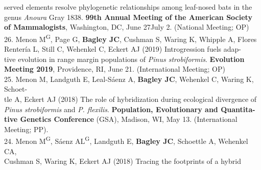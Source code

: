 \documentclass[margin,line]{res}
\begin{document}
\begin{resume}
\hspace*{8mm} served elements resolve phylogenetic relationships among leaf-nosed bats in the\\
\hspace*{8mm} genus \emph{Anoura} Gray 1838. \textbf{99th Annual Meeting of the American Society}\\ \vspace{2mm}
\hspace*{8mm}\textbf{of Mammalogists}, Washington, DC, June 27\textendash July 2. (National Meeting; OP)\\ 
26. Menon M\textsuperscript{G}, Page G, \textbf{Bagley JC}, Cushman S, Waring K, Whipple A, Flores\textendash \\
\hspace*{8mm} Renter\'{i}a L, Still C, Wehenkel C, Eckert AJ (2019) Introgression fuels adap-\\
\hspace*{8mm} tive evolution in range margin populations of \emph{Pinus strobiformis}. \textbf{Evolution} \\ \vspace{2mm}
\hspace*{8mm}\textbf{Meeting 2019}, Providence, RI, June 21. (International Meeting; OP) \\
25. Menon M, Landguth E, Leal-S\'{a}enz A, \textbf{Bagley JC}, Wehenkel C, Waring K, Schoet-\\
\hspace*{8mm} tle A, Eckert AJ (2018) The role of hybridization during ecological divergence of \\
\hspace*{8mm} \textit{Pinus strobiformis} and \textit{P. flexilis}. \textbf{Population, Evolutionary and Quantita-}\\
\hspace*{8mm} \textbf{tive Genetics Conference} (GSA), Madison, WI, May 13. (International\\ \vspace{2mm}
\hspace*{8mm}Meeting; PP). \\
24. Menon M\textsuperscript{G}, S\'{a}enz AL\textsuperscript{G}, Landguth E, \textbf{Bagley JC}, Schoettle A, Wehenkel CA,\\
\hspace*{8mm} Cushman S, Waring K, Eckert AJ (2018) Tracing the footprints of a hybrid\\

\end{resume}
\end{document}
